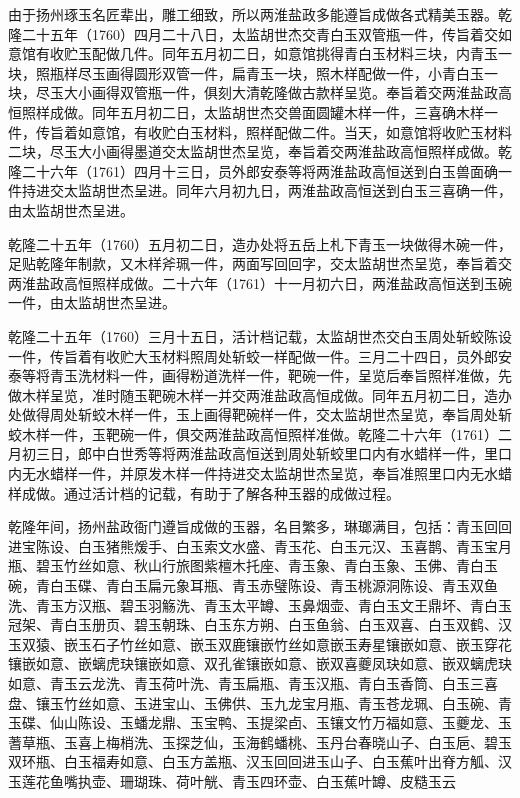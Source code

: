 由于扬州琢玉名匠辈出，雕工细致，所以两淮盐政多能遵旨成做各式精美玉器。乾隆二十五年（1760）四月二十八日，太监胡世杰交青白玉双管瓶一件，传旨着交如意馆有收贮玉配做几件。同年五月初二日，如意馆挑得青白玉材料三块，内青玉一块，照瓶样尽玉画得圆形双管一件，扁青玉一块，照木样配做一件，小青白玉一块，尽玉大小画得双管瓶一件，俱刻大清乾隆做古款样呈览。奉旨着交两淮盐政高恒照样成做。同年五月初二日，太监胡世杰交兽面圆罐木样一件，三喜确木样一件，传旨着如意馆，有收贮白玉材料，照样配做二件。当天，如意馆将收贮玉材料二块，尽玉大小画得墨道交太监胡世杰呈览，奉旨着交两淮盐政高恒照样成做。乾隆二十六年（1761）四月十三日，员外郎安泰等将两淮盐政高恒送到白玉兽面确一件持进交太监胡世杰呈进。同年六月初九日，两淮盐政高恒送到白玉三喜确一件，由太监胡世杰呈进。


乾隆二十五年（1760）五月初二日，造办处将五岳上札下青玉一块做得木碗一件，足贴乾隆年制款，又木样斧珮一件，两面写回回字，交太监胡世杰呈览，奉旨着交两淮盐政高恒照样成做。二十六年（1761）十一月初六日，两淮盐政高恒送到玉碗一件，由太监胡世杰呈进。

乾隆二十五年（1760）三月十五日，活计档记载，太监胡世杰交白玉周处斩蛟陈设一件，传旨着有收贮大玉材料照周处斩蛟一样配做一件。三月二十四日，员外郎安泰等将青玉洗材料一件，画得粉道洗样一件，靶碗一件，呈览后奉旨照样准做，先做木样呈览，准时随玉靶碗木样一并交两淮盐政高恒成做。同年五月初二日，造办处做得周处斩蛟木样一件，玉上画得靶碗样一件，交太监胡世杰呈览，奉旨周处斩蛟木样一件，玉靶碗一件，俱交两淮盐政高恒照样准做。乾隆二十六年（1761）二月初三日，郎中白世秀等将两淮盐政高恒送到周处斩蛟里口内有水蜡样一件，里口内无水蜡样一件，并原发木样一件持进交太监胡世杰呈览，奉旨准照里口内无水蜡样成做。通过活计档的记载，有助于了解各种玉器的成做过程。

乾隆年间，扬州盐政衙门遵旨成做的玉器，名目繁多，琳瑯满目，包括：青玉回回进宝陈设、白玉猪熊煖手、白玉索文水盛、青玉花、白玉元汉、玉喜鹊、青玉宝月瓶、碧玉竹丝如意、秋山行旅图紫檀木托座、青玉象、青白玉象、玉佛、青白玉碗，青白玉碟、青白玉扁元象耳瓶、青玉赤璧陈设、青玉桃源洞陈设、青玉双鱼洗、青玉方汉瓶、碧玉羽觞洗、青玉太平罇、玉鼻烟壶、青白玉文王鼎坏、青白玉冠架、青白玉册页、碧玉朝珠、白玉东方朔、白玉鱼翁、白玉双喜、白玉双鹤、汉玉双猿、嵌玉石子竹丝如意、嵌玉双鹿镶嵌竹丝如意嵌玉寿星镶嵌如意、嵌玉穿花镶嵌如意、嵌螭虎玦镶嵌如意、双孔雀镶嵌如意、嵌双喜夔凤玦如意、嵌双螭虎玦如意、青玉云龙洗、青玉荷叶洗、青玉扁瓶、青玉汉瓶、青白玉香筒、白玉三喜盘、镶玉竹丝如意、玉进宝山、玉佛供、玉九龙宝月瓶、青玉苍龙珮、白玉碗、青玉碟、仙山陈设、玉蟠龙鼎、玉宝鸭、玉提梁卣、玉镶文竹万福如意、玉夔龙、玉蓍草瓶、玉喜上梅梢洗、玉探芝仙，玉海鹤蟠桃、玉丹台春晓山子、白玉巵、碧玉双环瓶、白玉福寿如意、白玉方盖瓶、汉玉回回进玉山子、白玉蕉叶出脊方觚、汉玉莲花鱼嘴执壶、珊瑚珠、荷叶觥、青玉四环壶、白玉蕉叶罇、皮糙玉云


